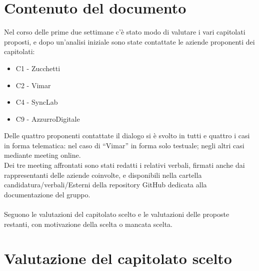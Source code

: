 \documentclass[10pt]{article}
\begin{document}
\section{Contenuto del documento}
\textbf{}Nel corso delle prime due settimane c'è stato modo di valutare i vari capitolati proposti, e dopo un’analisi iniziale sono state contattate le aziende proponenti dei capitolati:
\begin{itemize}
    \item C1 - Zucchetti
    \item C2 - Vimar
    \item C4 - SyncLab
    \item C9 - AzzurroDigitale
\end{itemize}
\textbf{}Delle quattro proponenti contattate il dialogo si è svolto in tutti e quattro i casi in forma telematica: nel caso di “Vimar” in forma solo testuale; negli altri casi mediante meeting online.\\
Dei tre meeting affrontati sono stati redatti i relativi verbali, firmati anche dai rappresentanti delle aziende coinvolte, e disponibili nella cartella candidatura/verbali/Esterni della repository GitHub dedicata alla documentazione del gruppo.\\
\\
Seguono le valutazioni del capitolato scelto e le valutazioni delle proposte restanti, con motivazione della scelta o mancata scelta.

\section{Valutazione del capitolato scelto}
\end{document}
